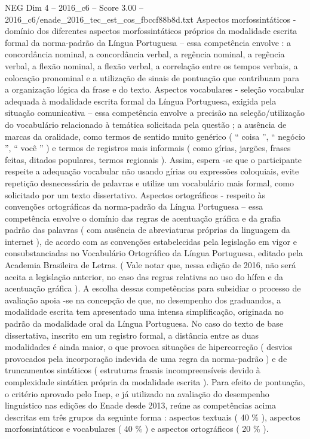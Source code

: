 \begin{textsample}{NEG Dim 4 – 2016\_c6 – Score 3.00 – 2016\_c6/enade\_2016\_tec\_est\_cos\_fbccf88b8d.txt}
Aspectos morfossintáticos - domínio dos diferentes aspectos morfossintáticos próprios da modalidade escrita formal da norma-padrão da Língua Portuguesa – essa competência envolve : a concordância nominal, a concordância verbal, a regência nominal, a regência verbal, a flexão nominal, a flexão verbal, a correlação entre os tempos verbais, a colocação pronominal e a utilização de sinais de pontuação que contribuam para a organização lógica da frase e do texto.
Aspectos vocabulares - seleção vocabular adequada à modalidade escrita formal da Língua Portuguesa, exigida pela situação comunicativa – essa competência envolve a precisão na seleção/utilização do vocabulário relacionado à temática solicitada pela questão ; a ausência de marcas da oralidade, como termos de sentido muito genérico ( “ coisa ”, “ negócio ”, “ você ” ) e termos de registros mais informais ( como gírias, jargões, frases feitas, ditados populares, termos regionais ).
Assim, espera -se que o participante respeite a adequação vocabular não usando gírias ou expressões coloquiais, evite repetição desnecessária de palavras e utilize um vocabulário mais formal, como solicitado por um texto dissertativo.
Aspectos ortográficos - respeito às convenções ortográficas da norma-padrão da Língua Portuguesa – essa competência envolve o domínio das regras de acentuação gráfica e da grafia padrão das palavras ( com ausência de abreviaturas próprias da linguagem da internet ), de acordo com as convenções estabelecidas pela legislação em vigor e consubstanciadas no Vocabulário Ortográfico da Língua Portuguesa, editado pela Academia Brasileira de Letras. ( Vale notar que, nessa edição de 2016, não será aceita a legislação anterior, no caso das regras relativas ao uso do hífen e da acentuação gráfica ).
A escolha dessas competências para subsidiar o processo de avaliação apoia -se na concepção de que, no desempenho dos graduandos, a modalidade escrita tem apresentado uma intensa simplificação, originada no padrão da modalidade oral da Língua Portuguesa.
No caso do texto de base dissertativa, inscrito em um registro formal, a distância entre as duas modalidades é ainda maior, o que provoca situações de hipercorreção ( desvios provocados pela incorporação indevida de uma regra da norma-padrão ) e de truncamentos sintáticos ( estruturas frasais incompreensíveis devido à complexidade sintática própria da modalidade escrita ).
Para efeito de pontuação, o critério aprovado pelo Inep, e já utilizado na avaliação do desempenho linguístico nas edições do Enade desde 2013, reúne as competências acima descritas em três grupos da seguinte forma : aspectos textuais ( 40 \% ), aspectos morfossintáticos e vocabulares ( 40 \% ) e aspectos ortográficos ( 20 \% ).

\end{textsample}

